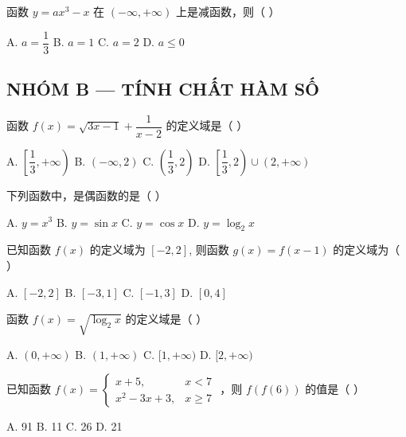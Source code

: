 \documentclass[11pt, a4paper]{article}
\begin{document}
\begin{baitap}[13]
函数 $y = ax^3 - x$ 在 $(-\infty, +\infty)$ 上是减函数，则（ ）
\par\vspace{3pt}
\noindent A. $a = \dfrac{1}{3}$ \quad B. $a = 1$ \quad C. $a = 2$ \quad D. $a \le 0$
\end{baitap}

\subsection*{NHÓM B — TÍNH CHẤT HÀM SỐ}

\begin{baitap}[14]
函数 $f(x) = \sqrt{3x - 1} + \dfrac{1}{x-2}$ 的定义域是（ ）
\par\vspace{3pt}
\noindent A. $\left[\dfrac{1}{3}, +\infty\right)$ \quad B. $(-\infty, 2)$ \quad C. $\left(\dfrac{1}{3}, 2\right)$ \quad D. $\left[\dfrac{1}{3}, 2\right) \cup (2, +\infty)$
\end{baitap}

\begin{baitap}[15]
下列函数中，是偶函数的是（ ）
\par\vspace{3pt}
\noindent A. $y = x^3$ \quad B. $y = \sin x$ \quad C. $y = \cos x$ \quad D. $y = \log_{2}x$
\end{baitap}

\begin{baitap}[16]
已知函数 $f(x)$ 的定义域为 $[-2,2]$, 则函数 $g(x) = f(x - 1)$ 的定义域为（ ）
\par\vspace{3pt}
\noindent A. $[-2,2]$ \quad B. $[-3,1]$ \quad C. $[-1,3]$ \quad D. $[0,4]$
\end{baitap}

\begin{baitap}[17]
函数 $f(x) = \sqrt{\log_2 x}$ 的定义域是（ ）
\par\vspace{3pt}
\noindent A. $(0, +\infty)$ \quad B. $(1, +\infty)$ \quad C. $[1, +\infty)$ \quad D. $[2, +\infty)$
\end{baitap}

\begin{baitap}[18]
已知函数 $f(x) = \begin{cases} x + 5, & x < 7 \\ x^2 - 3x + 3, & x \ge 7 \end{cases}$ ，则 $f(f(6))$ 的值是（ ）
\par\vspace{3pt}
\noindent A. 91 \quad B. 11 \quad C. 26 \quad D. 21
\end{baitap}
\end{document}
